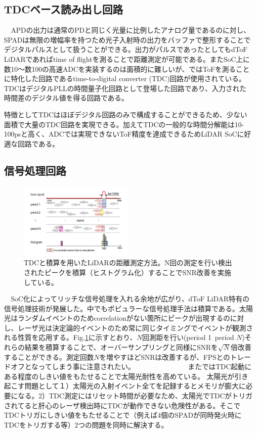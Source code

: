 \documentclass[twocolumn, 11pt, a4j]{article}
\begin{document}
\subsection{TDCベース読み出し回路}
　APDの出力は通常のPDと同じく光量に比例したアナログ量であるのに対し、SPADは無限の増幅率を持つため光子入射時の出力をバッファで整形することでデジタルパルスとして扱うことができる。出力がパルスであったとしてもdToF LiDARであればtime of flightを測ることで距離測定が可能である。またSoC上に数10～数100の高速ADCを実装するのは面積的に難しいが、\cite{niclass2012100}ではToFを測ることに特化した回路であるtime-to-digital converter (TDC)回路が使用されている。TDCはデジタルPLLの時間量子化回路として登場した回路であり、入力された時間差のデジタル値を得る回路である\cite{leetdc, elkholytdc}。
 
特徴としてTDCはほぼデジタル回路のみで構成することができるため、少ない面積で大量のTDC回路を実現できる。加えてTDCの一般的な時間分解能は10-100psと高く、ADCでは実現できないToF精度を達成できるためLiDAR SoCに好適な回路である。

\subsection{信号処理回路}
\begin{figure}[!t]
\centering
 \includegraphics[width=0.5\textwidth]{figs/threshold.png}
  \caption{TDCと積算を用いたLiDARの距離測定方法\cite{niclass2012100}。N回の測定を行い検出されたピークを積算（ヒストグラム化）することでSNR改善を実施している。}
\label{tdc}
\end{figure}

　SoC化によってリッチな信号処理を入れる余地が広がり、dToF LiDAR特有の信号処理技術が発展した。中でもポピュラーな信号処理手法は積算である。太陽光はランダムイベントのためcorrelationがない箇所にピークが出現するのに対し、レーザ光は決定論的イベントのため常に同じタイミングでイベントが観測される性質を応用する。Fig.\ref{tdc}に示すとおり、$N$回測距を行い(period 1~period $N$)それらの結果を積算することで、オーバーサンプリングと同様にSNRを$\sqrt{N}$倍改善することができる。測定回数$N$を増やすほどSNRは改善するが、FPSとのトレードオフとなってしまう事に注意されたい。
　　　　　　　
また\cite{niclass2012100}ではTDC起動にある程度のしきい値をもたせることで太陽光耐性を高めている。
太陽光が引き起こす問題として１）太陽光の入射イベント全てを記録するとメモリが膨大に必要になる。2）TDC測定にはリセット時間が必要なため、太陽光でTDCがトリガされてると肝心のレーザ検出時にTDCが動作できない危険性がある。そこでTDCトリガにしきい値をもたせることで（例えば4個のSPADが同時発火時にTDCをトリガする等）2つの問題を同時に解決する。
\end{document}
